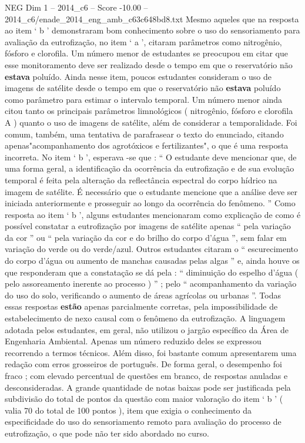 \begin{textsample}{NEG Dim 1 – 2014\_c6 – Score -10.00 – 2014\_c6/enade\_2014\_eng\_amb\_c63c648bd8.txt}
Mesmo aqueles que na resposta ao item ‘ b ’ demonstraram bom conhecimento sobre o uso do sensoriamento para avaliação da eutrofização, no item ‘ a ’, citaram parâmetros como nitrogênio, fósforo e clorofila.
Um número menor de estudantes se preocupou em citar que esse monitoramento deve ser realizado desde o tempo em que o reservatório não \textbf{estava} poluído.
Ainda nesse item, poucos estudantes consideram o uso de imagens de satélite desde o tempo em que o reservatório não \textbf{estava} poluído como parâmetro para estimar o intervalo temporal.
Um número menor ainda citou tanto os principais parâmetros limnológicos ( nitrogênio, fósforo e clorofila A ) quanto o uso de imagens de satélite, além de considerar a temporalidade.
Foi comum, também, uma tentativa de parafrasear o texto do enunciado, citando apenas"acompanhamento dos agrotóxicos e fertilizantes", o que é uma resposta incorreta.
No item ‘ b ’, esperava -se que : “ O estudante deve mencionar que, de uma forma geral, a identificação da ocorrência da eutrofização e de sua evolução temporal é feita pela alteração da reflectância espectral do corpo hídrico na imagem de satélite.
É necessário que o estudante mencione que a análise deve ser iniciada anteriormente e prosseguir ao longo da ocorrência do fenômeno. ” Como resposta ao item ‘ b ’, alguns estudantes mencionaram como explicação de como é possível constatar a eutrofização por imagens de satélite apenas “ pela variação da cor ” ou “ pela variação da cor e do brilho do corpo d’água ”, sem falar em variação do verde ou do verde/azul.
Outros estudantes citaram o “ escurecimento do corpo d’água ou aumento de manchas causadas pelas algas ” e, ainda houve os que responderam que a constatação se dá pela : “ diminuição do espelho d’água ( pelo assoreamento inerente ao processo ) ” ; pelo “ acompanhamento da variação do uso do solo, verificando o aumento de áreas agrícolas ou urbanas ”.
Todas essas respostas \textbf{estão} apenas parcialmente corretas, pela impossibilidade de estabelecimento de nexo causal com o fenômeno da eutrofização.
A linguagem adotada pelos estudantes, em geral, não utilizou o jargão específico da Área de Engenharia Ambiental.
Apenas um número reduzido deles se expressou recorrendo a termos técnicos.
Além disso, foi bastante comum apresentarem uma redação com erros grosseiros de português.
De forma geral, o desempenho foi fraco ; com elevado percentual de questões em branco, de respostas anuladas e desconsideradas.
A grande quantidade de notas baixas pode ser justificada pela subdivisão do total de pontos da questão com maior valoração do item ‘ b ’ ( valia 70 do total de 100 pontos ), item que exigia o conhecimento da especificidade do uso do sensoriamento remoto para avaliação do processo de eutrofização, o que pode não ter sido abordado no curso.

\end{textsample}
